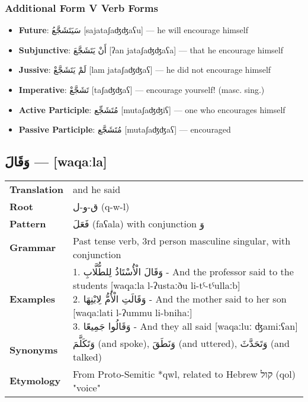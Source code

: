 \documentclass[letterpaper,12pt]{article}
\begin{document}
\subsubsection*{Additional Form V Verb Forms}
\begin{itemize}
  \item \textbf{Future}: \textarabic{سَيَتَشَجَّعُ} [sajataʃaʤʤaʕu] — he will encourage himself
  \item \textbf{Subjunctive}: \textarabic{أَنْ يَتَشَجَّعَ} [ʔan jataʃaʤʤaʕa] — that he encourage himself
  \item \textbf{Jussive}: \textarabic{لَمْ يَتَشَجَّعْ} [lam jataʃaʤʤaʕ] — he did not encourage himself
  \item \textbf{Imperative}: \textarabic{تَشَجَّعْ} [taʃaʤʤaʕ] — encourage yourself! (masc. sing.)
  \item \textbf{Active Participle}: \textarabic{مُتَشَجِّع} [mutaʃaʤʤiʕ] — one who encourages himself
  \item \textbf{Passive Participle}: \textarabic{مُتَشَجَّع} [mutaʃaʤʤaʕ] — encouraged
\end{itemize}

\subsection{\textarabic{وَقَالَ} — [waqaːla]}

\begin{tabular}{p{3cm}p{10cm}}
\toprule
\textbf{Translation} & and he said \\
\textbf{Root} & \textarabic{ق-و-ل} (q-w-l) \\
\textbf{Pattern} & \textarabic{فَعَلَ} (faʕala) with conjunction \textarabic{وَ} \\
\textbf{Grammar} & Past tense verb, 3rd person masculine singular, with conjunction \\
\textbf{Examples} & \makecell[l]{\parbox{9.5cm}{
1. \textarabic{وَقَالَ الْأُسْتَاذُ لِلطُّلَّابِ} - And the professor said to the students [waqaːla l-ʔustaːðu li-tˤ-tˤullaːb]\\
2. \textarabic{وَقَالَتِ الْأُمُّ لِابْنِهَا} - And the mother said to her son [waqaːlati l-ʔummu li-bnihaː]\\
3. \textarabic{وَقَالُوا جَمِيعًا} - And they all said [waqaːluː ʤamiːʕan]
}} \\
\midrule
\textbf{Synonyms} & \textarabic{وَتَكَلَّمَ} (and spoke), \textarabic{وَنَطَقَ} (and uttered), \textarabic{وَتَحَدَّثَ} (and talked) \\
\textbf{Etymology} & From Proto-Semitic *qwl, related to Hebrew \texthebrew{קול} (qol) "voice" \\
\bottomrule
\end{tabular}
\end{document}
